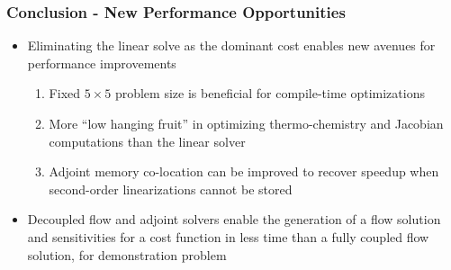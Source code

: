 \documentclass{beamer}
\begin{document}
\begin{frame}
  \frametitle{Conclusion - New Performance Opportunities}
  \begin{itemize}
    \item Eliminating the linear solve as the dominant cost enables new avenues
      for performance improvements
      \begin{enumerate}
        \item Fixed $5 \times 5$ problem size is beneficial for compile-time
          optimizations
        \item More ``low hanging fruit'' in optimizing thermo-chemistry and
          Jacobian computations than the linear solver
        \item Adjoint memory co-location can be improved to recover speedup when
          second-order linearizations cannot be stored
      \end{enumerate}
    \item Decoupled flow and adjoint solvers enable the generation of a flow
      solution and sensitivities for a cost function in less time than a fully
      coupled flow solution, for demonstration problem
  \end{itemize}
\end{frame}
\end{document}
